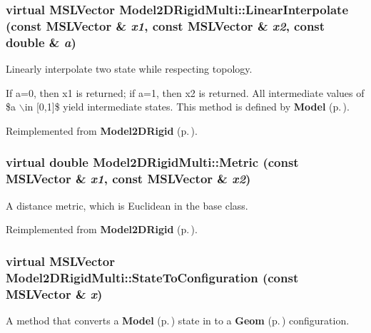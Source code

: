 \subsubsection{\setlength{\rightskip}{0pt plus 5cm}virtual {\bf MSLVector} Model2DRigid\-Multi::Linear\-Interpolate (const {\bf MSLVector} \& {\em x1}, const {\bf MSLVector} \& {\em x2}, const double \& {\em a})\hspace{0.3cm}{\tt  [virtual]}}\label{class_Model2DRigidMulti_a4}


Linearly interpolate two state while respecting topology.

If a=0, then x1 is returned; if a=1, then x2 is returned. All intermediate values of \$a $\backslash$in [0,1]\$ yield intermediate states. This method is defined by {\bf Model} {\rm (p.\,\pageref{class_Model})}. 

Reimplemented from {\bf Model2DRigid} {\rm (p.\,\pageref{class_Model2DRigid_a4})}.
\subsubsection{\setlength{\rightskip}{0pt plus 5cm}virtual double Model2DRigid\-Multi::Metric (const {\bf MSLVector} \& {\em x1}, const {\bf MSLVector} \& {\em x2})\hspace{0.3cm}{\tt  [virtual]}}\label{class_Model2DRigidMulti_a2}


A distance metric, which is Euclidean in the base class.



Reimplemented from {\bf Model2DRigid} {\rm (p.\,\pageref{class_Model2DRigid_a5})}.
\subsubsection{\setlength{\rightskip}{0pt plus 5cm}virtual {\bf MSLVector} Model2DRigid\-Multi::State\-To\-Configuration (const {\bf MSLVector} \& {\em x})\hspace{0.3cm}{\tt  [virtual]}}\label{class_Model2DRigidMulti_a3}


A method that converts a {\bf Model} {\rm (p.\,\pageref{class_Model})} state in to a {\bf Geom} {\rm (p.\,\pageref{class_Geom})} configuration.



